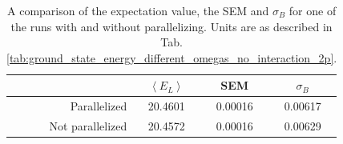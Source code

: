 \begin{table}[H]\caption{A comparison of the expectation value, the SEM and $\sigma_B$ for one of the runs with and without parallelizing. Units are as described in Tab. \ref{tab:ground_state_energy_different_omegas_no_interaction_2p}.}\label{tab:energy_parallelization}
\center
\begin{tabular}{r|ccc}
& $\left< E_L \right>$ & SEM & $\sigma_B$ \\ \hline
Parallelized & 20.4601 & 0.00016 & 0.00617 \\
Not parallelized & 20.4572 & 0.00016 & 0.00629 \\
\end{tabular}
\end{table}
